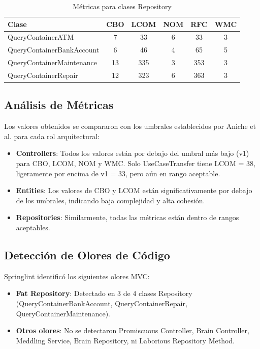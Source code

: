 \begin{table}[h]
\centering
\caption{Métricas para clases Repository}
\label{tab:repository_metrics}
\begin{tabular}{|l|c|c|c|c|c|}
\hline
Clase & CBO & LCOM & NOM & RFC & WMC \\
\hline
QueryContainerATM & 7 & 33 & 6 & 33 & 3 \\
QueryContainerBankAccount & 6 & 46 & 4 & 65 & 5 \\
QueryContainerMaintenance & 13 & 335 & 3 & 353 & 3 \\
QueryContainerRepair & 12 & 323 & 6 & 363 & 3 \\
\hline
\end{tabular}
\end{table}

\subsection{Análisis de Métricas}
Los valores obtenidos se compararon con los umbrales establecidos por Aniche et al. \cite{aniche2016satt} para cada rol arquitectural:

\begin{itemize}
\item \textbf{Controllers}: Todos los valores están por debajo del umbral más bajo (v1) para CBO, LCOM, NOM y WMC. Solo UseCaseTransfer tiene LCOM = 38, ligeramente por encima de v1 = 33, pero aún en rango aceptable.
\item \textbf{Entities}: Los valores de CBO y LCOM están significativamente por debajo de los umbrales, indicando baja complejidad y alta cohesión.
\item \textbf{Repositories}: Similarmente, todas las métricas están dentro de rangos aceptables.
\end{itemize}

\subsection{Detección de Olores de Código}
Springlint identificó los siguientes olores MVC:
\begin{itemize}
\item \textbf{Fat Repository}: Detectado en 3 de 4 clases Repository (QueryContainerBankAccount, QueryContainerRepair, QueryContainerMaintenance).
\item \textbf{Otros olores}: No se detectaron Promiscuous Controller, Brain Controller, Meddling Service, Brain Repository, ni Laborious Repository Method.
\end{itemize}

